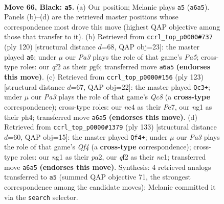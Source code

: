 \documentclass[11pt]{article}
\begin{document}
\clearpage

\begin{figure}[p]\centering
\begin{subfigure}{0.46\textwidth}\centering
\resizebox{\linewidth}{!}{%
\newchessgame
\chessboard[
  setfen={8/5Q2/p7/3P2kp/2N3p1/8/5Q2/5KN1 b - - 2 66},
  showmover=false,
  pgfstyle=straightmove, color=movearrow, markmove={a6-a5}
]}
\caption{}
\end{subfigure}\hfill
\begin{subfigure}{0.46\textwidth}\centering
\resizebox{\linewidth}{!}{%
\newchessgame
\chessboard[
  setfen={8/7p/6p1/P3k3/3pq3/7P/6P1/3Q2K1 w - - 0 61},
  showmover=false,
  pgfstyle=straightmove, color=movearrow, markmove={a5-a6}
]}
\caption{}
\end{subfigure}
\\[4pt]
\begin{subfigure}{0.46\textwidth}\centering
\resizebox{\linewidth}{!}{%
\newchessgame
\chessboard[
  setfen={8/4p1k1/6p1/4P2p/4Q2P/5K2/6P1/2q5 b - - 0 62},
  showmover=false,
  pgfstyle=straightmove, color=movearrow, markmove={c1-c3}
]}
\caption{}
\end{subfigure}\hfill
\begin{subfigure}{0.46\textwidth}\centering
\resizebox{\linewidth}{!}{%
\newchessgame
\chessboard[
  setfen={8/8/1k6/1pp2q2/8/p7/P2KQ3/2N5 b - - 1 67},
  showmover=false,
  pgfstyle=straightmove, color=movearrow, markmove={f5-f4}
]}
\caption{}
\end{subfigure}
\caption{\textbf{Move 66, Black: \texttt{a5}.} (a) Our position; Melanie plays \texttt{a5} (\texttt{a6a5}). Panels (b)--(d) are the retrieved master positions whose correspondence most drove this move (highest QAP objective among those that transfer to it). (b) Retrieved from \texttt{ccrl\_top\_p0000\#737} (ply 120) [structural distance $d$=68, QAP obj=23]: the master played \texttt{a6}; under $\mu$ our \emph{Pa3} plays the role of that game's \emph{Pa5}; cross-type roles: our \emph{q}f2 as their \emph{p}g6; transferred move \texttt{a6a5} \textbf{(endorses this move)}. (c) Retrieved from \texttt{ccrl\_top\_p0000\#156} (ply 123) [structural distance $d$=67, QAP obj=22]: the master played \texttt{Qc3+}; under $\mu$ our \emph{Pa3} plays the role of that game's \emph{Qc8} (a \textbf{cross-type} correspondence); cross-type roles: our \emph{n}c4 as their \emph{P}e7, our \emph{n}g1 as their \emph{p}h4; transferred move \texttt{a6a5} \textbf{(endorses this move)}. (d) Retrieved from \texttt{ccrl\_top\_p0000\#1379} (ply 133) [structural distance $d$=60, QAP obj=15]: the master played \texttt{Qf4+}; under $\mu$ our \emph{Pa3} plays the role of that game's \emph{Qf4} (a \textbf{cross-type} correspondence); cross-type roles: our \emph{n}g1 as their \emph{p}a2, our \emph{q}f2 as their \emph{n}c1; transferred move \texttt{a6a5} \textbf{(endorses this move)}. Synthesis: 4 retrieved analogs transferred to \texttt{a5} (summed QAP objective 71, the strongest correspondence among the candidate moves); Melanie committed it via the \texttt{search} selector.}
\label{fig:thought-m131}
\end{figure}
\end{document}
